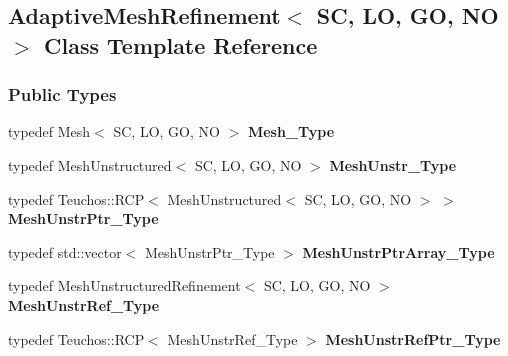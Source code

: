 \hypertarget{classFEDD_1_1AdaptiveMeshRefinement}{}\subsection{Adaptive\+Mesh\+Refinement$<$ SC, LO, GO, NO $>$ Class Template Reference}
\label{classFEDD_1_1AdaptiveMeshRefinement}
\subsubsection*{Public Types}
\begin{DoxyCompactItemize}
\item 
\mbox{\label{classFEDD_1_1AdaptiveMeshRefinement_a1e469aabe3952e2cd5797236ba2d80b7}} 
typedef Mesh$<$ SC, LO, GO, NO $>$ {\bfseries Mesh\+\_\+\+Type}
\item 
\mbox{\label{classFEDD_1_1AdaptiveMeshRefinement_aa284ad39ff56f20f0e0fb1736a706ed7}} 
typedef Mesh\+Unstructured$<$ SC, LO, GO, NO $>$ {\bfseries Mesh\+Unstr\+\_\+\+Type}
\item 
\mbox{\label{classFEDD_1_1AdaptiveMeshRefinement_a5dfa0d2bb61c7c09eb7b752b8353cf16}} 
typedef Teuchos\+::\+R\+CP$<$ Mesh\+Unstructured$<$ SC, LO, GO, NO $>$ $>$ {\bfseries Mesh\+Unstr\+Ptr\+\_\+\+Type}
\item 
\mbox{\label{classFEDD_1_1AdaptiveMeshRefinement_a049d8b7e6d1b66326cb5f7576e94a517}} 
typedef std\+::vector$<$ Mesh\+Unstr\+Ptr\+\_\+\+Type $>$ {\bfseries Mesh\+Unstr\+Ptr\+Array\+\_\+\+Type}
\item 
\mbox{\label{classFEDD_1_1AdaptiveMeshRefinement_a47782b5df3098ee9e0a10ac3fc9e0af5}} 
typedef Mesh\+Unstructured\+Refinement$<$ SC, LO, GO, NO $>$ {\bfseries Mesh\+Unstr\+Ref\+\_\+\+Type}
\item 
\mbox{\label{classFEDD_1_1AdaptiveMeshRefinement_a2aacfeb1017dfaed95ea0ac573f94bd8}} 
typedef Teuchos\+::\+R\+CP$<$ Mesh\+Unstr\+Ref\+\_\+\+Type $>$ {\bfseries Mesh\+Unstr\+Ref\+Ptr\+\_\+\+Type}

\end{DoxyCompactItemize}
